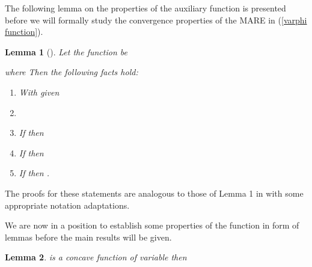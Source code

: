 \documentclass[journal]{IEEEtran}
\newtheorem{lemma}{Lemma}
\begin{document}
 The following lemma on the properties of the auxiliary function  is presented before we will formally study the convergence properties of the MARE in (\ref{varphi function}).
\begin{lemma}[\cite{tac2004sinopoli}]\label{psi lemma}
Let the function  be

where  Then the following facts hold:
\begin{enumerate}
\item With given  \label{fact11}
\item \label{fact12}
\item If  then \label{fact13}
\item If  then \label{fact14}
\item If  then \label{fact15}.
\end{enumerate}
\iffalse pwhere, a small covariance matrix is indeed a covariance matrix with small trace and the Kalman filter minimizes the trace of the ocvariance matrix. Therefore, (\ref{fact12}) implies \fi
\end{lemma}
\begin{IEEEproof}
The proofs for these statements are analogous to those of Lemma 1 in \cite{tac2004sinopoli} with some appropriate notation adaptations.
\end{IEEEproof}


\iffalse
{\emph{Proof:}}
The proof is quite similar to that of Lemma 1 in \cite{tac2004sinopoli}. \\
(1) Note that

Given that  then it easily follows that

Therefore, by adding the following auxiliary term  to  it yields that

(2) Define function  Obviously,

For  considering  is a quadratic and convex function of variable  so the minimizer can be obtained via solving  and it follows that

Clearly, the fact can be derived from fact (1).\newline
(3) Observe that  is affine in  so  for  and any   Assume  then

The remaining facts (4)-(7) can be easily proved, so here omitted.

\fi

\iffalse
We are now in a position to establish some properties of the function  in form of lemmas before the main results will be given.
\begin{lemma}\label{concave varphi}
 is a concave function of variable  then 
\end{lemma}
\end{document}
